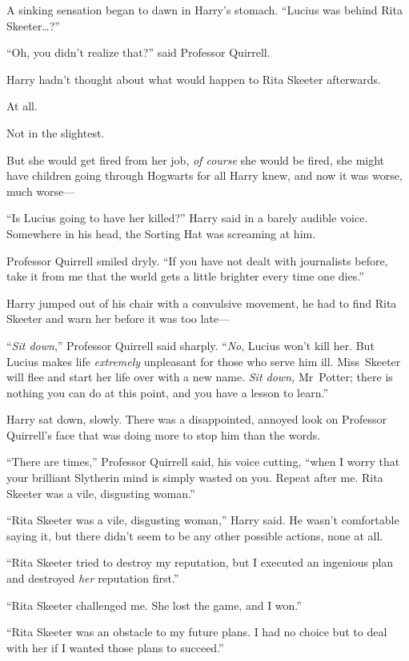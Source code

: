 A sinking sensation began to dawn in Harry’s stomach.
“Lucius was behind Rita Skeeter…?”

“Oh, you didn’t realize that?” said Professor Quirrell.

Harry hadn’t thought about what would happen to Rita Skeeter afterwards.

At all.

Not in the slightest.

But she would get fired from her job, \emph{of course} she would be fired, she might have children going through Hogwarts for all Harry knew, and now it was worse, much worse—

“Is Lucius going to have her killed?” Harry said in a barely audible voice. Somewhere in his head, the Sorting Hat was screaming at him.

Professor Quirrell smiled dryly.
“If you have not dealt with journalists before, take it from me that the world gets a little brighter every time one dies.”

Harry jumped out of his chair with a convulsive movement, he had to find Rita Skeeter and warn her before it was too late—

“\emph{Sit down},” Professor Quirrell said sharply. “\emph{No}, Lucius won’t kill her. But Lucius makes life \emph{extremely} unpleasant for those who serve him ill. Miss~Skeeter will flee and start her life over with a new name. \emph{Sit down,} Mr~Potter; there is nothing you can do at this point, and you have a lesson to learn.”

Harry sat down, slowly. There was a disappointed, annoyed look on Professor Quirrell’s face that was doing more to stop him than the words.

“There are times,” Professor Quirrell said, his voice cutting, “when I worry that your brilliant Slytherin mind is simply wasted on you. Repeat after me. Rita Skeeter was a vile, disgusting woman.”

“Rita Skeeter was a vile, disgusting woman,” Harry said. He wasn’t comfortable saying it, but there didn’t seem to be any other possible actions, none at all.

“Rita Skeeter tried to destroy my reputation, but I executed an ingenious plan and destroyed \emph{her} reputation first.”

“Rita Skeeter challenged me. She lost the game, and I won.”

“Rita Skeeter was an obstacle to my future plans. I had no choice but to deal with her if I wanted those plans to succeed.”

